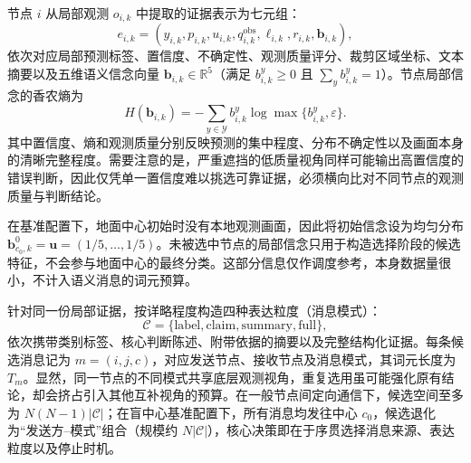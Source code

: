 节点 $i$ 从局部观测 $o_{i,k}$ 中提取的证据表示为七元组：
\begin{equation}
e_{i,k}=\left(y_{i,k},p_{i,k},u_{i,k},q_{i,k}^{\mathrm{obs}},\ell_{i,k},r_{i,k},\bm b_{i,k}\right),
\label{rq2:eq:evidence}
\end{equation}
依次对应局部预测标签、置信度、不确定性、观测质量评分、裁剪区域坐标、文本摘要以及五维语义信念向量 $\bm b_{i,k}\in\mathbb R^5$（满足 $b_{i,k}^{y}\geq0$ 且 $\sum_y b_{i,k}^{y}=1$）。节点局部信念的香农熵为
\begin{equation}
H(\bm b_{i,k})=-\sum_{y\in\mathcal Y}b_{i,k}^{y}\log\max\{b_{i,k}^{y},\varepsilon\}.
\label{rq2:eq:entropy}
\end{equation}
其中置信度、熵和观测质量分别反映预测的集中程度、分布不确定性以及画面本身的清晰完整程度。需要注意的是，严重遮挡的低质量视角同样可能输出高置信度的错误判断，因此仅凭单一置信度难以挑选可靠证据，必须横向比对不同节点的观测质量与判断结论。

在基准配置下，地面中心初始时没有本地观测画面，因此将初始信念设为均匀分布 $\bm b_{c_0,k}^{0}=\bm u=(1/5,\ldots,1/5)$。未被选中节点的局部信念只用于构造选择阶段的候选特征，不会参与地面中心的最终分类。这部分信息仅作调度参考，本身数据量很小，不计入语义消息的词元预算。

针对同一份局部证据，按详略程度构造四种表达粒度（消息模式）：
\begin{equation}
\mathcal C=\{\mathrm{label},\mathrm{claim},\mathrm{summary},\mathrm{full}\},
\label{rq2:eq:modes}
\end{equation}
依次携带类别标签、核心判断陈述、附带依据的摘要以及完整结构化证据。每条候选消息记为 $m=(i,j,c)$，对应发送节点、接收节点及消息模式，其词元长度为 $T_m$。显然，同一节点的不同模式共享底层观测视角，重复选用虽可能强化原有结论，却会挤占引入其他互补视角的预算。在一般节点间定向通信下，候选空间至多为 $N(N-1)|\mathcal C|$；在盲中心基准配置下，所有消息均发往中心 $c_0$，候选退化为“发送方--模式”组合（规模约 $N|\mathcal C|$），核心决策即在于序贯选择消息来源、表达粒度以及停止时机。

